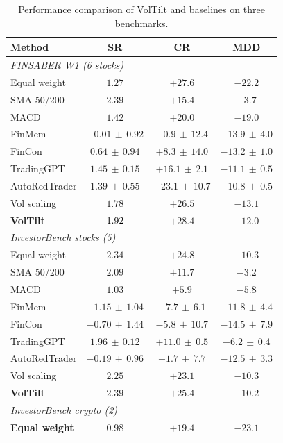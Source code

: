 \begin{table}[!t]
\centering
\caption{Performance comparison of VolTilt and baselines on three benchmarks.}
\label{tab:main}
{\small
\setlength{\tabcolsep}{5pt}
\begin{tabular*}{\textwidth}{@{\extracolsep{\fill}}lccc}
\toprule
Method & SR & CR & MDD \\
\midrule
\multicolumn{4}{l}{\textit{FINSABER W1 (6 stocks)}} \\
Equal weight & $1.27$ & $+27.6$ & $-22.2$ \\
SMA 50/200 & $\mathbf{2.39}$ & $+15.4$ & $\mathbf{-3.7}$ \\
MACD & $1.42$ & $+20.0$ & $-19.0$ \\
FinMem & $-0.01\,{\pm}\,0.92$ & $-0.9\,{\pm}\,12.4$ & $-13.9\,{\pm}\,4.0$ \\
FinCon & $0.64\,{\pm}\,0.94$ & $+8.3\,{\pm}\,14.0$ & $-13.2\,{\pm}\,1.0$ \\
TradingGPT & $1.45\,{\pm}\,0.15$ & $+16.1\,{\pm}\,2.1$ & $-11.1\,{\pm}\,0.5$ \\
AutoRedTrader & $1.39\,{\pm}\,0.55$ & $+23.1\,{\pm}\,10.7$ & $-10.8\,{\pm}\,0.5$ \\
Vol scaling & $1.78$ & $+26.5$ & $-13.1$ \\
\textbf{VolTilt} & $1.92$ & $\mathbf{+28.4}$ & $-12.0$ \\
\midrule
\multicolumn{4}{l}{\textit{InvestorBench stocks (5)}} \\
Equal weight & $2.34$ & $+24.8$ & $-10.3$ \\
SMA 50/200 & $2.09$ & $+11.7$ & $\mathbf{-3.2}$ \\
MACD & $1.03$ & $+5.9$ & $-5.8$ \\
FinMem & $-1.15\,{\pm}\,1.04$ & $-7.7\,{\pm}\,6.1$ & $-11.8\,{\pm}\,4.4$ \\
FinCon & $-0.70\,{\pm}\,1.44$ & $-5.8\,{\pm}\,10.7$ & $-14.5\,{\pm}\,7.9$ \\
TradingGPT & $1.96\,{\pm}\,0.12$ & $+11.0\,{\pm}\,0.5$ & $-6.2\,{\pm}\,0.4$ \\
AutoRedTrader & $-0.19\,{\pm}\,0.96$ & $-1.7\,{\pm}\,7.7$ & $-12.5\,{\pm}\,3.3$ \\
Vol scaling & $2.25$ & $+23.1$ & $-10.3$ \\
\textbf{VolTilt} & $\mathbf{2.39}$ & $\mathbf{+25.4}$ & $-10.2$ \\
\midrule
\multicolumn{4}{l}{\textit{InvestorBench crypto (2)}} \\
\textbf{Equal weight} & $\mathbf{0.98}$ & $\mathbf{+19.4}$ & $-23.1$ \\

\end{tabular*}}
\end{table}
